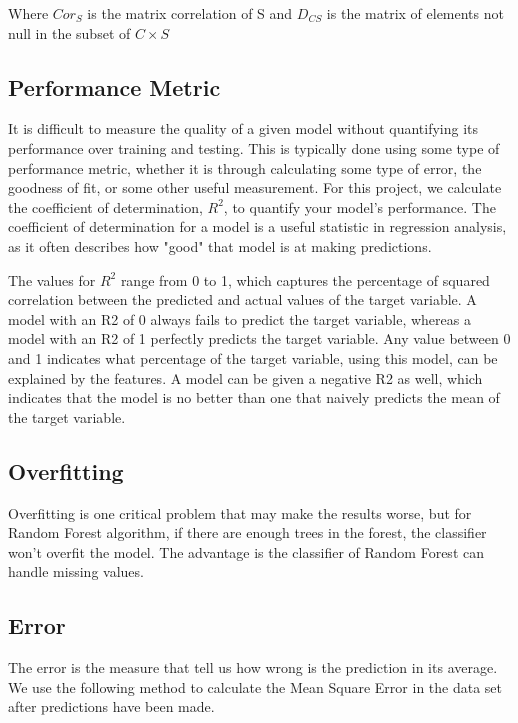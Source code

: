 \documentclass[a4project, twocolumn]{article}
\begin{document}
Where $Cor_S$ is the matrix correlation of S and $D_{CS}$ is the matrix of elements not null in the subset of $C \times S$

 
\subsection{Performance Metric}

It is difficult to measure the quality of a given model without quantifying its performance over training and testing. This is typically done using some type of performance metric, whether it is through calculating some type of error, the goodness of fit, or some other useful measurement. For this project, we calculate the coefficient of determination, $R^2$, to quantify your model's performance. The coefficient of determination for a model is a useful statistic in regression analysis, as it often describes how "good" that model is at making predictions.

The values for $R^2$ range from 0 to 1, which captures the percentage of squared correlation between the predicted and actual values of the target variable. A model with an R2 of 0 always fails to predict the target variable, whereas a model with an R2 of 1 perfectly predicts the target variable. Any value between 0 and 1 indicates what percentage of the target variable, using this model, can be explained by the features. A model can be given a negative R2 as well, which indicates that the model is no better than one that naively predicts the mean of the target variable.

\subsection{Overfitting}

Overfitting is one critical problem that may make the results worse, but for Random Forest algorithm, if there are enough trees in the forest, the classifier won’t overfit the model. The advantage is the classifier of Random Forest can handle missing values.

\subsection{Error}

The error is the measure that tell us how wrong is the prediction in its average. We use the following method to calculate the Mean Square Error in the data set after predictions have been made.
\end{document}
